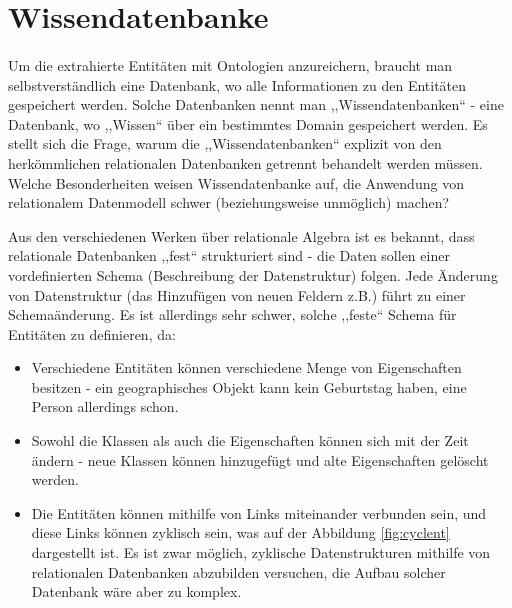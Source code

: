 \section{Wissendatenbanke} \label{sec:wiss}
\paragraph{}
Um die extrahierte Entitäten mit Ontologien anzureichern, braucht man selbstverständlich eine Datenbank, wo alle Informationen zu den Entitäten gespeichert werden. Solche Datenbanken nennt man ,,Wissendatenbanken`` - eine Datenbank, wo ,,Wissen`` über ein bestimmtes Domain gespeichert werden. Es stellt sich die Frage, warum die ,,Wissendatenbanken`` explizit von den herkömmlichen relationalen Datenbanken getrennt behandelt werden müssen. Welche Besonderheiten weisen Wissendatenbanke auf, die Anwendung von relationalem Datenmodell schwer (beziehungsweise unmöglich) machen?

Aus den verschiedenen Werken über relationale Algebra\cite{meier2013relationale} ist es bekannt, dass relationale Datenbanken ,,fest`` strukturiert sind - die Daten sollen einer vordefinierten Schema (Beschreibung der Datenstruktur) folgen. Jede Änderung von Datenstruktur (das Hinzufügen von neuen Feldern z.B.) führt zu einer Schemaänderung. Es ist allerdings sehr schwer, solche ,,feste`` Schema für Entitäten zu definieren, da:
\begin{itemize}
\item Verschiedene Entitäten können verschiedene Menge von Eigenschaften besitzen - ein geographisches Objekt kann kein Geburtstag haben, eine Person allerdings schon.
\item Sowohl die Klassen als auch die Eigenschaften können sich mit der Zeit ändern - neue Klassen können hinzugefügt und alte Eigenschaften gelöscht werden.
\item Die Entitäten können mithilfe von Links miteinander verbunden sein, und diese Links können zyklisch sein, was auf der Abbildung \ref{fig:cyclent} dargestellt ist. Es ist zwar möglich, zyklische Datenstrukturen mithilfe von relationalen Datenbanken abzubilden versuchen, die Aufbau solcher Datenbank wäre aber zu komplex.
\end{itemize}

